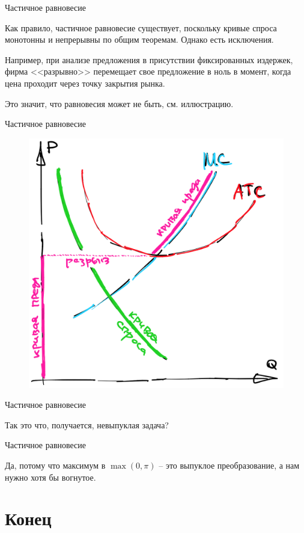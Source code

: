 \documentclass{beamer}
\begin{document}
\begin{frame}{Частичное равновесие}

Как правило, частичное равновесие существует, поскольку кривые спроса монотонны и непрерывны по общим теоремам. Однако есть исключения. 

Например, при анализе предложения в присутствии фиксированных издержек, фирма <<разрывно>> перемещает свое предложение в ноль в момент, когда цена проходит через точку закрытия рынка. 

Это значит, что равновесия может не быть, см. иллюстрацию.
	
\end{frame}

\begin{frame}{Частичное равновесие}

\begin{figure}[hbt]
\centering
\includegraphics[width=.7 \textwidth]{nonexistence.png}
\end{figure}
	
\end{frame}

\begin{frame}{Частичное равновесие}

Так это что, получается, невыпуклая задача?
	
\end{frame}

\begin{frame}{Частичное равновесие}

Да, потому что максимум в $\max(0, \pi)$ – это выпуклое преобразование, а нам нужно хотя бы вогнутое.
	
\end{frame}

\section{Конец}
\end{document}
